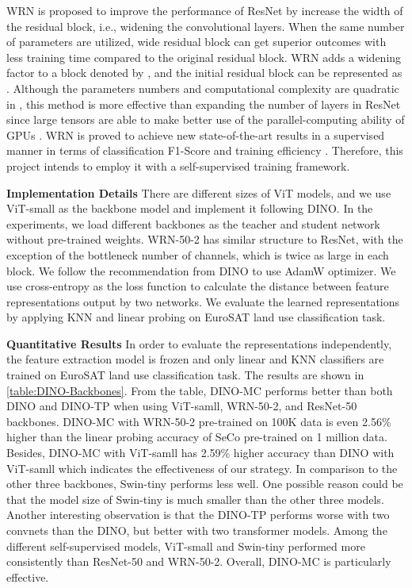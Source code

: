 \documentclass[10pt,twocolumn,letterpaper]{article}
\begin{document}
WRN \cite{zagoruyko2016wide} is proposed to improve the performance of ResNet by increase the width of the residual block, i.e., widening the convolutional layers.
When the same number of parameters are utilized, wide residual block can get superior outcomes with less training time compared to the original residual block.
WRN adds a widening factor to a block denoted by , and the initial residual block can be represented as . 
Although the parameters numbers and computational complexity are quadratic in , this method is more effective than expanding the number of layers in ResNet since large tensors are able to make better use of the parallel-computing ability of GPUs \cite{zagoruyko2016wide}.
WRN is proved to achieve new state-of-the-art results in a supervised manner in terms of classification F1-Score and training efficiency \cite{papoutsis2021efficient}.
Therefore, this project intends to employ it with a self-supervised training framework.

\textbf{Implementation Details }
There are different sizes of ViT models, and we use ViT-small as the backbone model and implement it following DINO.
In the experiments, we load different backbones as the teacher and student network without pre-trained weights.
WRN-50-2 has similar structure to ResNet, with the exception of the bottleneck number of channels, which is twice as large in each block.
We follow the recommendation from DINO to use AdamW optimizer.
We use cross-entropy as the loss function to calculate the distance between feature representations output by two networks.
We evaluate the learned representations by applying KNN and linear probing on EuroSAT land use classification task.


\textbf{Quantitative Results}
In order to evaluate the representations independently, the feature extraction model is frozen and only linear and KNN classifiers are trained on EuroSAT land use classification task.
The results are shown in \cref{table:DINO-Backbones}.
From the table, DINO-MC performs better than both DINO and DINO-TP when using ViT-samll, WRN-50-2, and ResNet-50 backbones.
DINO-MC with WRN-50-2 pre-trained on 100K data is even 2.56\% higher than the linear probing accuracy of SeCo pre-trained on 1 million data.
Besides, DINO-MC with ViT-samll has 2.59\% higher accuracy than DINO with ViT-samll which indicates the effectiveness of our strategy.
In comparison to the other three backbones, Swin-tiny performs less well.
One possible reason could be that the model size of Swin-tiny is much smaller than the other three models.
Another interesting observation is that the DINO-TP performs worse with two convnets than the DINO, but better with two transformer models.
Among the different self-supervised models, ViT-small and Swin-tiny performed more consistently than ResNet-50 and WRN-50-2.
Overall, DINO-MC is particularly effective.
\end{document}
